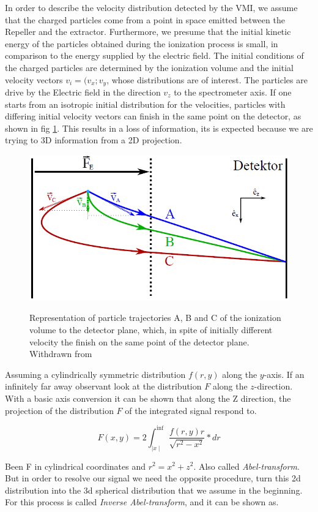 In order to describe the velocity distribution detected by the VMI, we assume that the charged particles come from a point in space emitted between the Repeller and the extractor. Furthermore, we presume that the initial kinetic energy of the particles obtained during the ionization process is small, in comparison to the energy supplied by the electric field.
The initial conditions of the charged particles are determined by the ionization volume and the initial velocity vectors $v_{i} = (v_{x};v_{y}$, whose distributions are of interest. The particles are drive by the Electric field in the direction $v_{z}$ to the spectrometer axis.
If one starts from an isotropic initial distribution for the velocities, particles with differing initial velocity vectors can finish in the same point on the detector, as shown in fig \ref{ing:vmiVelcDist}. This results in a loss of information, its is expected because we are trying to 3D information from a 2D projection.

\begin{figure}[h!]

\caption{Representation of particle trajectories A, B and C of the ionization volume to the detector plane, which, in spite of initially different velocity the finish on the same point of the detector plane. Withdrawn from \cite{fechner_lutz_aufbau_2011}}
\centering
\includegraphics[width=8 cm]{../Images/cel distrub vmi.png}
\label{ing:vmiVelcDist}
\end{figure}

Assuming a cylindrically symmetric distribution $f(r,y)$ along the $y$-axis. If an infinitely far away observant look at the distribution $F$ along the $z$-direction.  With a basic axis conversion it can be shown that along the Z direction, the projection of the distribution $F$ of the integrated signal respond to.

\begin{equation}
F(x,y)=2\int^{\inf}_{\mid x\mid} \dfrac{f(r,y)r}{\sqrt{r^{2}-x^{2}}}*dr 
\end{equation}

Been F in cylindrical coordinates and $r^{2}=x^{2}+z^{2}$. Also called \textit{Abel-transform}.
But in order to resolve our signal we need the opposite procedure, turn this 2d distribution into the 3d spherical distribution that we assume in the beginning. For this process is called \textit{Inverse Abel-transform}, and it can be shown as.
 
